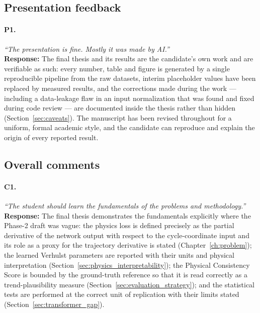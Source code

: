 \subsection*{Presentation feedback}

\paragraph{P1.} \emph{``The presentation is fine. Mostly it was made by AI.''}\\
\textbf{Response:} The final thesis and its results are the candidate's own
work and are verifiable as such: every number, table and figure is generated by
a single reproducible pipeline from the raw datasets, interim placeholder
values have been replaced by measured results, and the corrections made during
the work --- including a data-leakage flaw in an input normalization that was
found and fixed during code review --- are documented inside the thesis rather
than hidden (Section~\ref{sec:caveats}). The manuscript has been revised
throughout for a uniform, formal academic style, and the candidate can
reproduce and explain the origin of every reported result.

\subsection*{Overall comments}

\paragraph{C1.} \emph{``The student should learn the fundamentals of the
problems and methodology.''}\\
\textbf{Response:} The final thesis demonstrates the fundamentals explicitly
where the Phase-2 draft was vague: the physics loss is defined precisely as the
partial derivative of the network output with respect to the cycle-coordinate
input and its role as a proxy for the trajectory derivative is stated
(Chapter~\ref{ch:problem}); the learned Verhulst parameters are reported with
their units and physical interpretation
(Section~\ref{sec:physics_interpretability}); the Physical Consistency Score is
bounded by the ground-truth reference so that it is read correctly as a
trend-plausibility measure (Section~\ref{sec:evaluation_strategy}); and the
statistical tests are performed at the correct unit of replication with their
limits stated (Section~\ref{sec:transformer_gap}).

